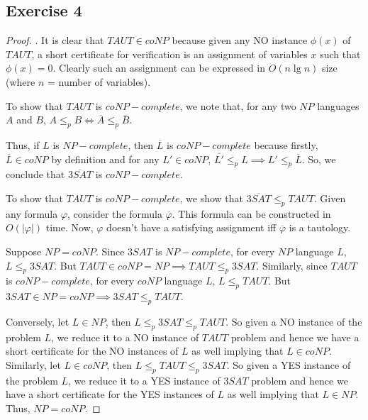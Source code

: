 \documentclass[12pt]{article}
\begin{document}
\subsection*{Exercise 4}
\begin{proof}.
It is clear that $TAUT \in coNP$ because given any NO instance $\phi(x)$ of $TAUT$, a short certificate for verification is an assignment of variables $x$ such that $\phi(x) = 0$. Clearly such an assignment can be expressed in $O(n\lg n)$ size (where $n$ = number of variables).

To show that $TAUT$ is $coNP-complete$, we note that, for any two $NP$ languages $A$ and $B$, $A \leq_p B \iff \overline{A} \leq_p \overline{B}$.

Thus, if $L$ is $NP-complete$, then $\overline{L}$ is $coNP-complete$ because firstly, $\overline{L} \in coNP$ by definition and for any $L' \in coNP$, $\overline{L'} \leq_p L \implies L' \leq_p \overline{L}$. So, we conclude that $\overline{3SAT}$ is $coNP-complete$.

To show that $TAUT$ is $coNP-complete$, we show that $\overline{3SAT} \leq_p TAUT$. Given any formula $\varphi$, consider the formula $\overline{\varphi}$. This formula can be constructed in $O(|\varphi|)$ time. Now, $\varphi$ doesn't have a satisfying assignment iff $\overline{\varphi}$ is a tautology.
\newline

Suppose $NP=coNP$. Since $3SAT$ is $NP-complete$, for every $NP$ language $L$, $L \leq_p 3SAT$. But $TAUT \in coNP = NP \implies TAUT \leq_p 3SAT$. Similarly, since $TAUT$ is $coNP-complete$, for every $coNP$ language $L$, $L \leq_p TAUT$. But $3SAT \in NP = coNP \implies 3SAT \leq_p TAUT$.

Conversely, let $L \in NP$, then $L \leq_p 3SAT \leq_p TAUT$. So given a NO instance of the problem $L$, we reduce it to a NO instance of $TAUT$ problem and hence we have a short certificate for the NO instances of $L$ as well implying that $L \in coNP$. Similarly, let $L \in coNP$, then $L \leq_p TAUT \leq_p 3SAT$. So given a YES instance of the problem $L$, we reduce it to a YES instance of $3SAT$ problem and hence we have a short certificate for the YES instances of $L$ as well implying that $L \in NP$. Thus, $NP=coNP$.
\end{proof}
\end{document}
